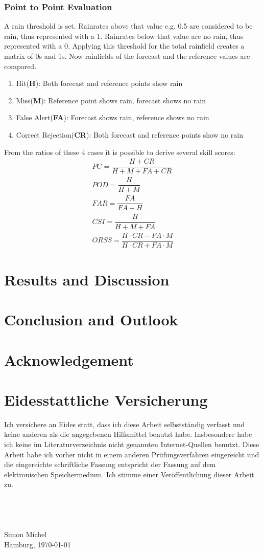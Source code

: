 \documentclass[11pt,twoside,a4paper,fleqn]{report}
\numberwithin{equation}{chapter}
\numberwithin{figure}{chapter}
\numberwithin{table}{chapter}
\begin{document}
\subsection{Point to Point Evaluation}
A rain threshold is set. Rainrates above that value e.g. 0.5 are considered to be rain, thus represented with a 1. Rainrates below that value are no rain, thus represented with a 0. Applying this threshold for the total rainfield creates a matrix of 0s and 1s. Now rainfields of the forecast and the reference values are compared.
\begin{enumerate}
	\item Hit(\textbf{H}): Both forecast and reference points show rain
	\item Miss(\textbf{M}): Reference point shows rain, forecast shows no rain
	\item False Alert(\textbf{FA}): Forecast shows rain, reference shows no rain
	\item Correct Rejection(\textbf{CR}): Both forecast and reference points show no rain
\end{enumerate}
From the ratios of these 4 cases it is possible to derive several skill scores:
\begin{equation}
\begin{array}{lcl}
	PC = \dfrac{H+CR}{H+M+FA+CR}\\
	POD = \dfrac{H}{H+M}\\
	FAR = \dfrac{FA}{FA+H}\\
	CSI = \dfrac{H}{H+M+FA}\\
	ORSS = \dfrac{H\cdot CR-FA\cdot M}{H\cdot CR+FA\cdot M}
\end{array}
\end{equation}
\chapter{Results and Discussion}
\chapter{Conclusion and Outlook}
\chapter{Acknowledgement}

\chapter{Eidesstattliche Versicherung}
Ich versichere an Eides statt, dass ich diese Arbeit selbstständig verfasst und keine anderen als die angegebenen Hilfsmittel benutzt habe. Insbesondere habe ich keine im Literaturverzeichnis nicht genannten Internet-Quellen benutzt. Diese Arbeit habe ich vorher nicht in einem anderen Prüfungsverfahren eingereicht und die eingereichte schriftliche Fassung entspricht der Fassung auf dem elektronischen Speichermedium. Ich stimme einer Veröffentlichung dieser Arbeit zu.
\\
\\
\\
\\
\\
Simon Michel\\
Hamburg, \today
\end{document}
